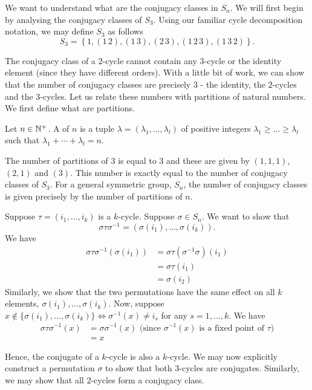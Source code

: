 We want to understand what are the conjugacy classes in $S_n$. We will first begin by analysing the conjugacy classes of $S_3$. Using our familiar cycle decomposition notation, we may define $S_3$ as follows
\[
    S_3 = \left\{ 1, (1 \, 2), (1 \, 3), (2 \, 3), (1 \, 2 \, 3), (1 \, 3 \, 2) \right\}.
\]

The conjugacy class of a $2$-cycle cannot contain any $3$-cycle or the identity element (since they have different orders). With a little bit of work, we can show that the number of conjugacy classes are precisely $3$ - the identity, the $2$-cycles and the $3$-cycles. Let us relate these numbers with partitions of natural numbers. We first define what are partitions.

\begin{defn}
    Let $n \in \mathbb{N}^+$. A  of $n$ is a tuple $\lambda = (\lambda_1, \ldots, \lambda_l)$ of positive integers $\lambda_1 \geq \ldots \geq \lambda_l$ such that $\lambda_1 + \cdots + \lambda_l = n$.
\end{defn}


The number of partitions of $3$ is equal to $3$ and these are given by $(1,1,1)$, $(2,1)$ and $(3)$. This number is exactly equal to the number of conjugacy classes of $S_3$. For a general symmetric group, $S_n$, the number of conjugacy classes is given precisely by the number of partitions of $n$. 

\medskip

Suppose $\tau = (i_1, \ldots, i_k)$ is a $k$-cycle. Suppose $\sigma \in S_n$. We want to show that 
\[
    \sigma\tau\sigma^{-1} = \left( \sigma(i_1), \ldots, \sigma(i_k) \right).
\]
We have
\begin{align*}
        \sigma\tau\sigma^{-1} (\sigma(i_1)) &= \sigma\tau(\sigma^{-1}\sigma)(i_1) \\
        &= \sigma\tau(i_1) \\
        &= \sigma(i_2)
\end{align*}
Similarly, we show that the two permutations have the same effect on all $k$  elements, $\sigma(i_1), \ldots, \sigma(i_k)$. Now, suppose $x \notin \{\sigma(i_1), \ldots , \sigma(i_k)\} \iff \sigma^{-1}(x) \neq i_s$ for any $s = 1, \ldots, k$. We have
\begin{align*}
    \sigma\tau\sigma^{-1}(x) &= \sigma\sigma^{-1}(x) \text{ (since $\sigma^{-1}(x)$ is a fixed point of $\tau$)} \\
    &= x
\end{align*}

Hence, the conjugate of a $k$-cycle is also a $k$-cycle. We may now explicitly construct a permutation $\sigma$ to show that both $3$-cycles are conjugates. Similarly, we may show that all $2$-cycles form a conjugacy class.


